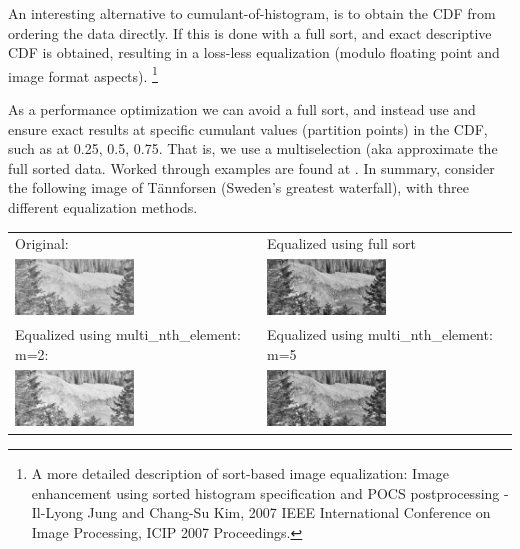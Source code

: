 An interesting alternative to cumulant-of-histogram, is to obtain the CDF from ordering the data directly. If this is done with a full sort, and exact descriptive CDF is obtained, resulting in a loss-less equalization (modulo floating point and image format aspects).%
\footnote{A more detailed description of sort-based image equalization: Image enhancement using sorted histogram specification and POCS postprocessing -
Il-Lyong Jung and Chang-Su Kim, 2007 IEEE International Conference on Image Processing, ICIP 2007 Proceedings.}

As a performance optimization we can avoid a full sort, and instead use  and ensure exact results at specific cumulant values (partition points) in the CDF, such as at 0.25, 0.5, 0.75. That is, we use a multiselection (aka  approximate the full sorted data. Worked through examples are found at \cite{p2375RefImpl}. In summary, consider the following image of Tännforsen (Sweden's greatest waterfall), with three different equalization methods.

\begin{tabular}{|l|l|} 
\hline
Original: & Equalized using full sort\\
\includegraphics[width=0.50\textwidth]{plotting/examples/forsen_roundtrip.small.jpg} &
\includegraphics[width=0.50\textwidth]{plotting/examples/forsen_sort.small.jpg} \\
\hline
Equalized using multi_nth_element: m=2: & Equalized using multi_nth_element: m=5\\
\includegraphics[width=0.50\textwidth]{plotting/examples/forsen_partition2.small.jpg} &
\includegraphics[width=0.50\textwidth]{plotting/examples/forsen_partition5.small.jpg}\\
\hline
\end{tabular}
\enlargethispage*{1em}

